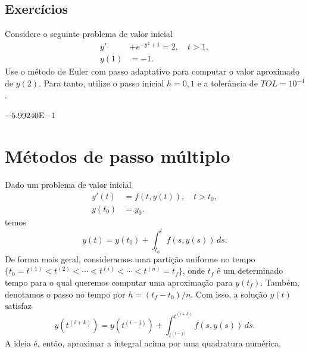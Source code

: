 \subsection*{Exercícios}

\begin{exer}
  Considere o seguinte problema de valor inicial
  \begin{align}
    y' &+ e^{-y^2+1} = 2,\quad t>1,\\
    y(1) &= -1.
  \end{align}
Use o método de Euler com passo adaptativo para computar o valor aproximado de $y(2)$. Para tanto, utilize o passo inicial $h=0,1$ e a tolerância de $TOL=10^{-4}$.
\end{exer}
\begin{resp}
  $-5.99240\mathrm{E}\!-\!1$
\end{resp}


\section{Métodos de passo múltiplo}\label{cap_pvi_sec_passo_mult}

Dado um problema de valor inicial
\begin{align}
  y'(t) &= f(t,y(t)),\quad t>t_0,\\
  y(t_0) &= y_0.
\end{align}
temos
\begin{equation}
  y(t) = y(t_0) + \int_{t_0}^t f(s,y(s))\,ds.
\end{equation}
De forma mais geral, consideramos uma partição uniforme no tempo $\{t_0=t^{(1)} < t^{(2)} < \cdots < t^{(i)} < \cdots < t^{(n)}=t_f\}$, onde $t_f$ é um determinado tempo para o qual queremos computar uma aproximação para $y(t_f)$. Também, denotamos o passo no tempo por $h=(t_f-t_0)/n$. Com isso, a solução $y(t)$ satisfaz
\begin{equation}
  y\left(t^{(i+k)}\right) = y\left(t^{(i-j)}\right) + \int_{t^{(i-j)}}^{t^{(i+k)}} f(s,y(s))\,ds.
\end{equation}
A ideia é, então, aproximar a integral acima por uma quadratura numérica.

